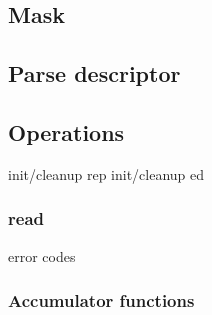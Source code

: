 \subsection{Mask}
\label{sec:arrays-masks}
\subsection{Parse descriptor}
\label{sec:arrays-parse-descriptors}
\subsection{Operations}
init/cleanup rep
init/cleanup ed
\subsubsection{read}
  error codes
\subsubsection{Accumulator functions}


